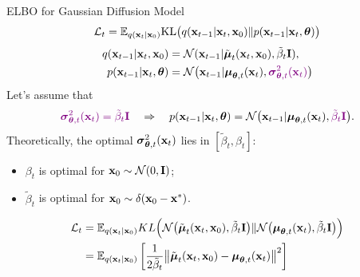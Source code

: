 \documentclass{beamer}
\begin{document}
\begin{frame}{ELBO for Gaussian Diffusion Model}
    \vspace{-0.3cm}
    \[
        \mathcal{L}_t = \mathbb{E}_{q(\mathbf{x}_t | \mathbf{x}_0)} \mathrm{KL} \bigl(q(\mathbf{x}_{t-1} | \mathbf{x}_t, \mathbf{x}_0) \| p(\mathbf{x}_{t - 1} | \mathbf{x}_t, \boldsymbol{\theta} )\bigr)
    \]
    \vspace{-0.4cm}
    \begin{align*}
        q(\mathbf{x}_{t-1} | \mathbf{x}_t, \mathbf{x}_0) &= \mathcal{N}(\mathbf{x}_{t-1} | \tilde{\boldsymbol{\mu}}_t(\mathbf{x}_t, \mathbf{x}_0), \tilde{\beta}_t \mathbf{I}), \\
        p(\mathbf{x}_{t - 1} | \mathbf{x}_t, \boldsymbol{\theta}) &= \mathcal{N} \bigl(\mathbf{x}_{t - 1} | \boldsymbol{\mu}_{\boldsymbol{\theta}, t}(\mathbf{x}_t), {\color{violet}\boldsymbol{\sigma}_{\boldsymbol{\theta}, t}^2(\mathbf{x}_t)}\bigr)
    \end{align*}
    Let's assume that
    \[
        {\color{violet}\boldsymbol{\sigma}_{\boldsymbol{\theta}, t}^2(\mathbf{x}_t) = \tilde{\beta}_t \mathbf{I}} \quad \Rightarrow \quad p(\mathbf{x}_{t - 1} | \mathbf{x}_t, \boldsymbol{\theta}) = \mathcal{N} \bigl(\mathbf{x}_{t - 1} | \boldsymbol{\mu}_{\boldsymbol{\theta}, t}(\mathbf{x}_t), {\color{violet}\tilde{\beta}_t \mathbf{I}} \bigr).
    \]
    Theoretically, the optimal $\boldsymbol{\sigma}_{\boldsymbol{\theta}, t}^2(\mathbf{x}_t)$ lies in $[\tilde{\beta}_t, \beta_t]$:
    \begin{itemize}
        \item $\beta_t$ is optimal for $\mathbf{x}_0 \sim \mathcal{N}(0, \mathbf{I})$;
        \item $\tilde{\beta}_t$ is optimal for $\mathbf{x}_0 \sim \delta(\mathbf{x}_0 - \mathbf{x}^*)$.
    \end{itemize}
    \begin{align*}
        \mathcal{L}_t &= \mathbb{E}_{q(\mathbf{x}_t | \mathbf{x}_0)} KL\Bigl(\mathcal{N}\bigl(\tilde{\boldsymbol{\mu}}_t(\mathbf{x}_t, \mathbf{x}_0), \tilde{\beta}_t \mathbf{I} \bigr) \| \mathcal{N}\bigl(\boldsymbol{\mu}_{\boldsymbol{\theta}, t}(\mathbf{x}_t), \tilde{\beta}_t \mathbf{I}\bigr)\Bigr) \\ 
        &= \mathbb{E}_{q(\mathbf{x}_t | \mathbf{x}_0)} \left[\frac{1}{2\tilde{\beta}_t} \bigl\| \tilde{\boldsymbol{\mu}}_t(\mathbf{x}_t, \mathbf{x}_0) - \boldsymbol{\mu}_{\boldsymbol{\theta}, t}(\mathbf{x}_t) \bigr\|^2  \right]
    \end{align*}
\end{frame}
\end{document}
